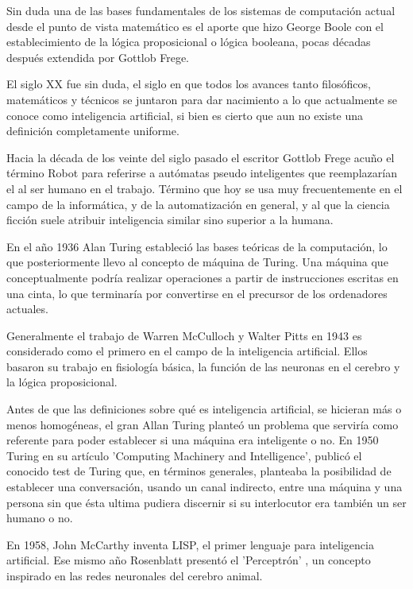         Sin duda una de las bases fundamentales de los sistemas de computación actual desde el punto de vista matemático es el aporte que hizo George Boole con el establecimiento de la lógica proposicional o lógica booleana, pocas décadas después extendida por Gottlob Frege.
        
        El siglo XX fue sin duda, el siglo en que todos los avances tanto filosóficos, matemáticos y técnicos se juntaron para dar nacimiento a lo que actualmente se conoce como inteligencia artificial, si bien es cierto que aun no existe una definición completamente uniforme.
        
        Hacia la década de los veinte del siglo pasado el escritor Gottlob Frege acuño el término Robot para referirse a autómatas pseudo inteligentes que reemplazarían el al ser humano en el trabajo. Término que hoy se usa muy frecuentemente en el campo de la informática, y de la automatización en general, y al que la ciencia ficción suele atribuir inteligencia similar sino superior a la humana.
        
        En el año 1936 Alan Turing estableció las bases teóricas de la computación, lo que posteriormente llevo al concepto de máquina de Turing. Una máquina que conceptualmente podría realizar operaciones a partir de instrucciones escritas en una cinta, lo que terminaría por convertirse en el precursor de los ordenadores actuales.
        
        Generalmente el trabajo de Warren McCulloch y Walter Pitts en 1943 \cite{McCulloch1943} es considerado como el primero en el campo de la inteligencia artificial. Ellos basaron su trabajo en fisiología básica, la función de las neuronas en el cerebro y la lógica proposicional. 

        Antes de que las definiciones sobre qué es inteligencia artificial, se hicieran más o menos homogéneas, el gran Allan Turing planteó un problema que serviría como referente para poder establecer si una máquina era inteligente o no. En 1950 Turing en su artículo 'Computing Machinery and Intelligence', publicó el conocido test de Turing \cite{Turing1950} que, en términos generales, planteaba la posibilidad de establecer una conversación, usando un canal indirecto, entre una máquina y una persona sin que ésta ultima pudiera discernir si su interlocutor era también un ser humano o no. 
        
        En 1958, John McCarthy inventa LISP, el primer lenguaje para inteligencia artificial. Ese mismo año Rosenblatt presentó el 'Perceptrón' \cite{Rosenblatt1958}, un concepto inspirado en las redes neuronales del cerebro animal.
        
